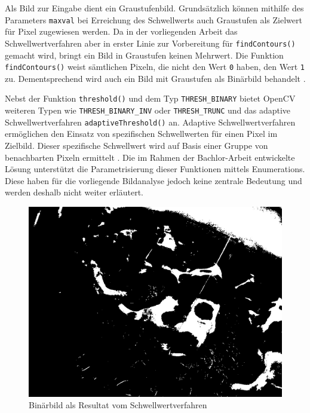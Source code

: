 Als Bild zur Eingabe dient ein Graustufenbild. Grundsätzlich können mithilfe des Parameters \texttt{maxval} bei Erreichung des Schwellwerts auch Graustufen als Zielwert für Pixel zugewiesen werden. Da in der vorliegenden Arbeit das Schwellwertverfahren aber in erster Linie zur Vorbereitung für \texttt{findContours()} gemacht wird, bringt ein Bild in Graustufen keinen Mehrwert. Die Funktion \texttt{findContours()} weist sämtlichen Pixeln, die nicht den Wert \texttt{0} haben, den Wert \texttt{1} zu. Dementsprechend wird auch ein Bild mit Graustufen als Binärbild behandelt \cite[S. 366]{FernandezVillan2019}. 



Nebst der Funktion \texttt{threshold()} und dem Typ \texttt{THRESH_BINARY} bietet OpenCV weiteren Typen wie \texttt{THRESH_BINARY_INV} oder \texttt{THRESH_TRUNC} und das adaptive Schwellwertverfahren \texttt{adaptiveThreshold()} an. Adaptive Schwellwertverfahren ermöglichen den Einsatz von spezifischen Schwellwerten für einen Pixel im Zielbild. Dieser spezifische Schwellwert wird auf Basis einer Gruppe von benachbarten Pixeln  ermittelt \cite[S.342 f]{FernandezVillan2019}. Die im Rahmen der Bachlor-Arbeit entwickelte Lösung unterstützt die Parametrisierung dieser Funktionen mittels Enumerations. Diese haben für die vorliegende Bildanalyse jedoch keine zentrale Bedeutung und werden deshalb nicht weiter erläutert.

\begin{figure}[H]
	\center
	\includegraphics[scale=0.43]{Grafiken/entwicklung/8thresholdedMask.jpg}
	\caption{Binärbild als Resultat vom Schwellwertverfahren} 
		\label{fig: Binärbild als Resultat vom Schwellwertverfahren}
\end{figure}
		
